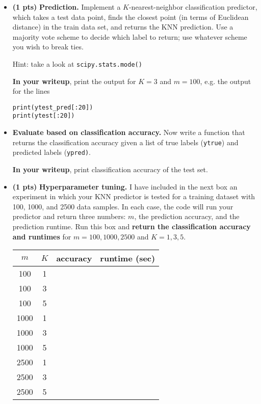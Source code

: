 \documentclass{article}
\newcommand{\showpoints}[1]{\textbf{(#1)}}
\begin{document}
\begin{enumerate}
\begin{itemize}
\item  \showpoints{1 pts}  \textbf{Prediction.} Implement a $K$-nearest-neighbor classification predictor, which takes a test data point, finds the closest point (in terms of Euclidean distance) in the train data set, and returns the KNN prediction. Use a majority vote scheme to decide which label to return; use whatever scheme you wish to break ties. 

Hint: take a look at \texttt{scipy.stats.mode()}

\textbf{In your writeup}, print the  output for $K=3$ and $m = 100$, e.g. the output for the lines

\begin{verbatim}
print(ytest_pred[:20])
print(ytest[:20])
\end{verbatim}


\item \textbf{Evaluate based on classification accuracy.} Now write a function that returns the classification accuracy given a list of true labels (\texttt{ytrue}) and predicted labels (\texttt{ypred)}. 


\textbf{In your writeup}, print classification accuracy of the test set.


\item  \showpoints{1 pts}  \textbf{Hyperparameter tuning.}  I have included in the next box an experiment in which your KNN predictor is tested for a training dataset with 100, 1000, and 2500 data samples. In each case, the code will run your predictor and return three numbers: $m$, the prediction accuracy, and the prediction runtime. Run this box and \textbf{return the classification accuracy and runtimes} for $m = 100,1000,2500$ and $K = 1,3,5$.

\begin{center}
\begin{tabular}{cccc}
$m$ & $K$ & accuracy & runtime (sec)\\\hline
100 & 1 & & \\
100 & 3 & & \\
100 & 5 & & \\
1000 & 1 & & \\
1000 & 3 & & \\
1000 & 5 & & \\
2500 & 1 & & \\
2500 & 3 & & \\
2500 & 5 & & \\
\end{tabular}
\end{center}


\end{itemize}
\end{enumerate}
\end{document}

